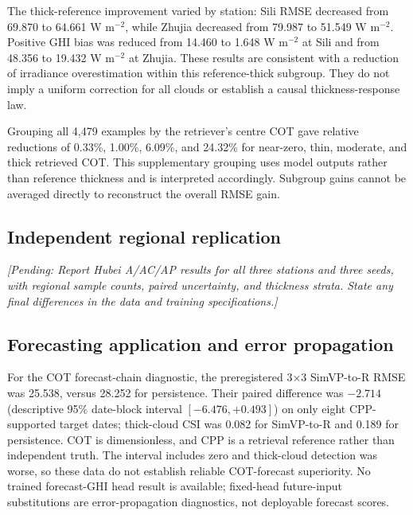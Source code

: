 \documentclass[11pt]{article}
\newcommand{\pending}[1]{\textit{[Pending: #1]}}
\begin{document}
The thick-reference improvement varied by station: Sili RMSE decreased from 69.870 to 64.661 W m$^{-2}$, while Zhujia decreased from 79.987 to 51.549 W m$^{-2}$. Positive GHI bias was reduced from 14.460 to 1.648 W m$^{-2}$ at Sili and from 48.356 to 19.432 W m$^{-2}$ at Zhujia. These results are consistent with a reduction of irradiance overestimation within this reference-thick subgroup. They do not imply a uniform correction for all clouds or establish a causal thickness-response law.

Grouping all 4,479 examples by the retriever's centre COT gave relative reductions of 0.33\%, 1.00\%, 6.09\%, and 24.32\% for near-zero, thin, moderate, and thick retrieved COT. This supplementary grouping uses model outputs rather than reference thickness and is interpreted accordingly. Subgroup gains cannot be averaged directly to reconstruct the overall RMSE gain.

\subsection{Independent regional replication}
\pending{Report Hubei A/AC/AP results for all three stations and three seeds, with regional sample counts, paired uncertainty, and thickness strata. State any final differences in the data and training specifications.}

\subsection{Forecasting application and error propagation}

For the COT forecast-chain diagnostic, the preregistered 3$\times$3 SimVP-to-R RMSE was 25.538, versus 28.252 for persistence. Their paired difference was $-2.714$ (descriptive 95\% date-block interval $[-6.476,+0.493]$) on only eight CPP-supported target dates; thick-cloud CSI was 0.082 for SimVP-to-R and 0.189 for persistence. COT is dimensionless, and CPP is a retrieval reference rather than independent truth. The interval includes zero and thick-cloud detection was worse, so these data do not establish reliable COT-forecast superiority. No trained forecast-GHI head result is available; fixed-head future-input substitutions are error-propagation diagnostics, not deployable forecast scores.
\end{document}
